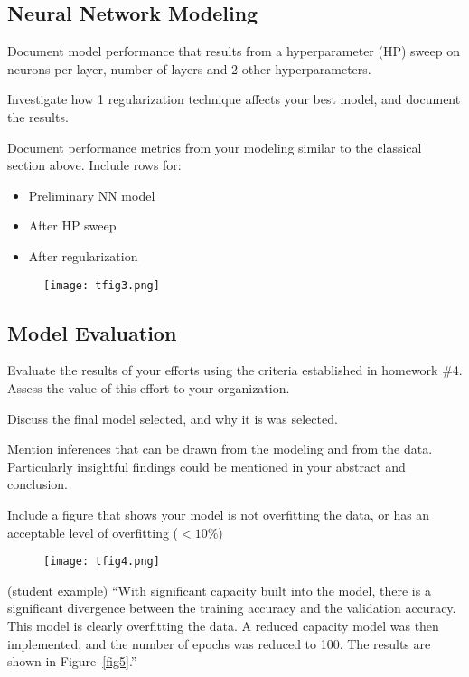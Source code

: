 \documentclass[letterpaper,conference]{IEEEtran}
\begin{document}
{\begin{table}[!h]
\begin{center}
\begin{tabular}{ l  c c c c c }
\end{tabular}
\end{center}
\end{table}
\subsection{Neural Network Modeling}
Document model performance that results from a hyperparameter (HP) sweep on neurons per layer, number of layers and 2 other hyperparameters. 

Investigate how 1 regularization technique affects your best model, and document the results.

Document performance metrics from your modeling similar to the classical section above. Include rows for:
\begin{itemize}
\item Preliminary NN model
\item After HP sweep
\item After regularization
\end{itemize}

\begin{figure}[!h]
\centering
\texttt{[image: tfig3.png]}
\caption{\color{RoyalBlue3}{Model performance resulting from hyperparameter sweep.}}
\label{fig3}
\end{figure}
\color{Red1}
\subsection{Model Evaluation}
Evaluate the results of your efforts using the criteria established in homework \#4.  Assess the value of this effort to your organization.

Discuss the final model selected, and why it is was selected.  

Mention inferences that can be drawn from the modeling and from the data. Particularly insightful findings could be mentioned in your abstract and conclusion. 

Include a figure that shows your model is not overfitting the data, or has an acceptable level of overfitting ($<10\%$)

\begin{figure}[!h]
\centering
\texttt{[image: tfig4.png]}
\caption{\color{Red1}{Neural network overfitting the dataset.}}
\label{fig4}
\end{figure}

     (student example) “With significant capacity built into the model, there is a significant divergence between the training accuracy and the validation accuracy. This model is clearly overfitting the data. A reduced capacity model was then implemented, and the number of epochs was reduced to 100. The results are shown in Figure~\ref{fig5}.”

}
\end{document}
